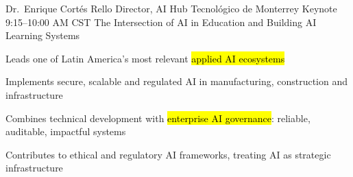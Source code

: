 
  {Dr.~Enrique Cortés Rello}
  {Director, AI Hub \textperiodcentered{} Tecnológico de Monterrey}
  {Keynote \textperiodcentered{} 9:15--10:00 AM CST}
  {The Intersection of AI in Education and Building AI Learning Systems}
  {\item Leads one of Latin America's most relevant \hl{applied AI ecosystems}
   \item Implements secure, scalable and regulated AI in manufacturing, construction and infrastructure
   \item Combines technical development with \hl{enterprise AI governance}: reliable, auditable, impactful systems
   \item Contributes to ethical and regulatory AI frameworks, treating AI as strategic infrastructure}
